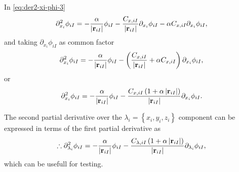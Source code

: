 In \cref{eq:der2-xi-phi-3}
\begin{equation}
    \partial_{x_{i}}^{2} \phi_{iI}
    =
    -
    \frac{
        \alpha
    }{
        \left| \boldsymbol{\mathrm{r}}_{iI} \right|
    }
    \phi_{iI}
    -
    \frac{
        C_{x,iI}
    }{
        \left| \boldsymbol{\mathrm{r}}_{iI} \right|
    }
    \partial_{x_{i}} \phi_{iI}
    - \alpha
    C_{x,iI}
    \partial_{x_i}
    \phi_{iI}
    ,
\end{equation}
and taking $\partial_{x_i} \phi_{iI}$ as common factor
\begin{equation}
    \partial_{x_{i}}^{2} \phi_{iI}
    =
    -
    \frac{
        \alpha
    }{
        \left| \boldsymbol{\mathrm{r}}_{iI} \right|
    }
    \phi_{iI}
    -
    \left( 
        \frac{
            C_{x,iI}
        }{
            \left| \boldsymbol{\mathrm{r}}_{iI} \right|
        }
        +
        \alpha
        C_{x,iI}
    \right)
    \partial_{x_i}
    \phi_{iI}
    ,
\end{equation}
or
\begin{equation}
    \partial_{x_{i}}^{2} \phi_{iI}
    =
    -
    \frac{
        \alpha
    }{
        \left| \boldsymbol{\mathrm{r}}_{iI} \right|
    }
    \phi_{iI}
    -
    \frac{
        C_{x,iI}
        \left( 
            1 + \alpha \left| \boldsymbol{\mathrm{r}}_{iI} \right|
        \right)
    }{
        \left| \boldsymbol{\mathrm{r}}_{iI} \right|
    }
    \partial_{x_i}
    \phi_{iI}
    .
\end{equation}

The second partial derivative over the 
$\lambda_i = \left\{ x_i, y_i, z_i \right\}$
component can be expressed in terms of the first partial derivative as
\begin{equation} \label{eq:partial-2-phi-lambda-first-der}
    \therefore
    \partial_{\lambda_{i}}^{2} \phi_{iI}
    =
    -
    \frac{
        \alpha
    }{
        \left| \boldsymbol{\mathrm{r}}_{iI} \right|
    }
    \phi_{iI}
    -
    \frac{
        C_{\lambda,iI}
        \left( 
            1 + \alpha \left| \boldsymbol{\mathrm{r}}_{iI} \right|
        \right)
    }{
        \left| \boldsymbol{\mathrm{r}}_{iI} \right|
    }
    \partial_{\lambda_i}
    \phi_{iI}
    ,
\end{equation}
which can be usefull for testing.

